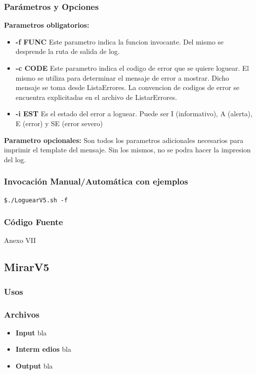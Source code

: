 \documentclass[a4paper,10pt,titlepage]{article}
\begin{document}
		\subsubsection{Par\'ametros y Opciones}
{\bf Parametros obligatorios:}
			\begin {itemize}
				\item \textbf{-f FUNC} {Este parametro indica la funcion invocante. Del mismo se desprende la ruta de salida de log.}
				\item \textbf{-c CODE} { Este parametro indica el codigo de error que se quiere loguear. El mismo se utiliza para determinar el mensaje de error a mostrar. Dicho mensaje se toma desde ListaErrores. La convencion de codigos de error se encuentra explicitadas en el archivo de ListarErrores.}
				\item \textbf{-i EST } {Es el estado del error a loguear. Puede ser I (informativo), A (alerta), E (error) y SE (error severo)}
			\end{itemize}

{\bf Parametro opcionales:} Son todos los parametros adicionales necesarios para imprimir el template del mensaje. Sin los mismos, no se podra hacer la impresion del log.
	
		\subsubsection{Invocaci\'on Manual/Autom\'atica con ejemplos}

\begin{verbatim}
$./LoguearV5.sh -f  
\end{verbatim}
		\subsubsection{C\'odigo Fuente}
			Anexo VII


	\subsection{MirarV5}
		\subsubsection{Usos}
			 
		\subsubsection{Archivos}
			\begin {itemize}
				\item \textbf{Input} {bla}
				\item \textbf{Interm edios} {bla}
				\item \textbf{Output} {bla}
			\end{itemize}
\end{document}
